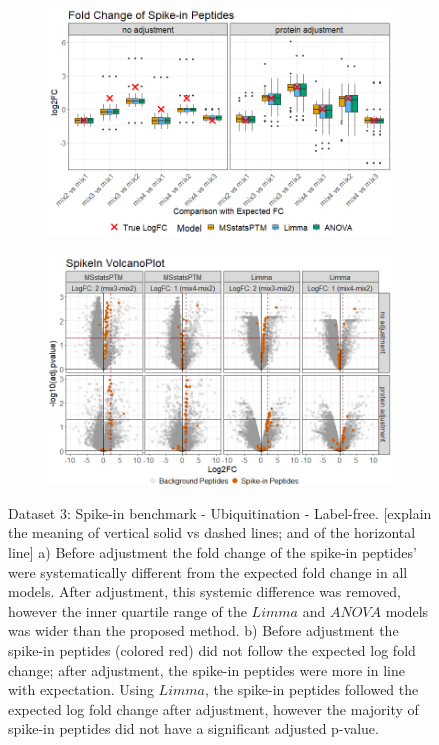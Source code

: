 \documentclass[mcp]{article}
\numberwithin{table}{section}
\def\todo#1{{\color{red}[#1]}}
\begin{document}
\begin{figure}[ht]
\centering
\begin{subfigure}[c]{0.825\linewidth}
\includegraphics[width=1\textwidth]{images/spike_in_fc.png}
\caption{}
\label{fig:spikein_boxplot}
\end{subfigure}
\begin{subfigure}[c]{0.825\linewidth}
\includegraphics[width=1\textwidth]{images/spike_in_volcano.png}
\caption{}
\label{fig:spikein_prop_volcano}
\end{subfigure}
\caption{Dataset 3: Spike-in benchmark - Ubiquitination - Label-free. \todo{explain the meaning of vertical solid vs dashed lines; and of the horizontal line} a) Before adjustment the fold change of the spike-in peptides' were systematically different from the expected fold change in all models. After adjustment, this systemic difference was removed, however the inner quartile range of the $Limma$ and $ANOVA$ models was wider than the proposed method. b) Before adjustment the spike-in peptides (colored red) did not follow the expected log fold change; after adjustment, the spike-in peptides were more in line with expectation. Using $Limma$, the spike-in peptides followed the expected log fold change after adjustment, however the majority of spike-in peptides did not have a significant adjusted p-value.}
\label{fig:spikein_volcano}
\end{figure}
\end{document}
